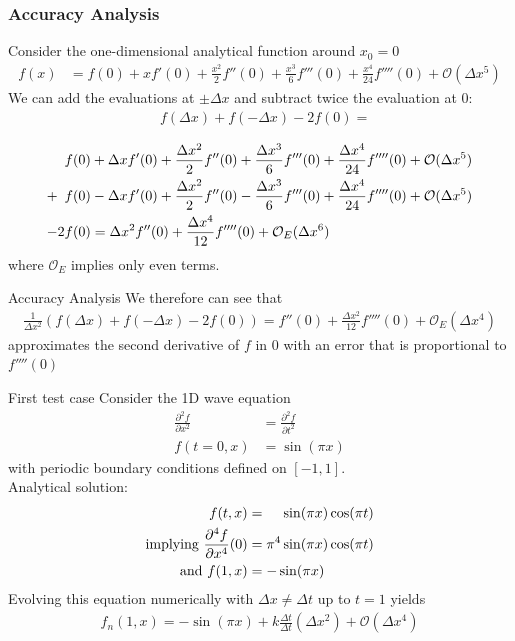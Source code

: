 \documentclass[5pt]{beamer}
\begin{document}
\begin{frame}
    \frametitle{Accuracy Analysis}
Consider the one-dimensional analytical function around $x_0 = 0$
\begin{align*}
f(x) &= f(0) + x f'(0) + \frac{x^2}{2}f''(0) + \frac{x^3}{6}f'''(0) + \frac{x^4}{24}f''''(0) + \mathcal{O}(\Delta x^5)
\end{align*}
\pause
We can add the evaluations at $\pm \Delta x$ and subtract twice the evaluation at $0$:
\begin{align*}
& f(\Delta x) + f(-\Delta x) - 2 f(0) = \\
\end{align*}
\pause
\begin{align*}
&  \hphantom{2} f(0) + \Delta x f'(0) + \frac{\Delta x ^ 2}{2}f''(0) + \frac{\Delta x ^ 3}{6}f'''(0) + \frac{\Delta x ^ 4}{24}f''''(0) + \mathcal{O}(\Delta x^5) \\
+& \hphantom{2} f(0) - \Delta x f'(0) + \frac{\Delta x ^ 2}{2}f''(0) - \frac{\Delta x ^ 3}{6}f'''(0) + \frac{\Delta x ^ 4}{24}f''''(0) + \mathcal{O}(\Delta x^5) \\
-& 2f(0) = \Delta x ^ 2 f''(0) +  \frac{\Delta x ^ 4}{12}f''''(0) + \mathcal{O}_E(\Delta x^6)
\end{align*}
where $\mathcal{O}_E$ implies only even terms.
\end{frame}
\begin{frame}
  {\huge Accuracy Analysis}
We therefore can see that 
\begin{align*}
\frac{1}{\Delta x^2} \left(f(\Delta x) + f(-\Delta x) - 2 f(0) \right) = f''(0) + \frac{\Delta x ^ 2}{12}f''''(0) + \mathcal{O}_E(\Delta x^4)
\end{align*}
approximates the second derivative of $f$ in $0$ with an error that is proportional to $f''''(0)$
\end{frame}
\begin{frame}
  {\huge First test case}
  Consider the 1D wave equation 
\begin{align*}
  \frac{\partial^2 f}{\partial x^2} &= \frac{\partial^2 f}{\partial t^2} \\ 
  f(t = 0, x) &= \sin(\pi x)
\end{align*}
with periodic boundary conditions defined on $[-1, 1]$.\\
\pause
Analytical solution:
\begin{align*}
f(t, x) &= \hphantom{\pi^4} \sin(\pi x)\cos(\pi t) \\
\text{implying } \frac{\partial^4 f}{\partial x^4}(0) &= \pi^4 \sin(\pi x) \cos(\pi t) \\
\text {and } f(1, x) &= -\sin(\pi x)
\end{align*}
Evolving this equation numerically with $\Delta x \neq \Delta t$ up to $t = 1$ yields
\begin{align*}
f_n(1, x) = -\sin(\pi x) + k\frac{\Delta t}{\Delta t}(\Delta x^2) + \mathcal{O}(\Delta x^4)
\end{align*}
\end{frame}
\end{document}
